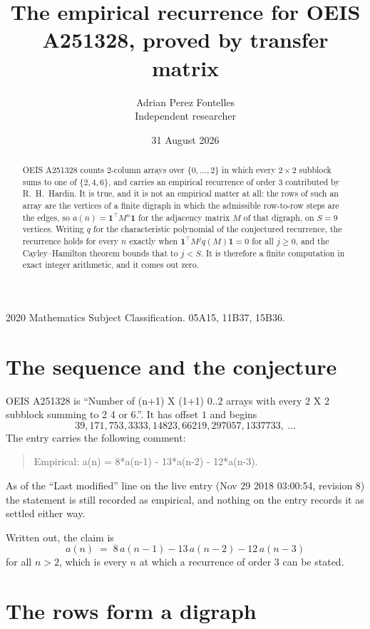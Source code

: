 \documentclass[11pt,a4paper]{article}
\title{The empirical recurrence for OEIS A251328, proved by transfer matrix}
\author{Adrian Perez Fontelles\\ \small Independent researcher}
\date{31 August 2026}
\theoremstyle{plain}
\theoremstyle{definition}
\begin{document}
\maketitle

\begin{abstract}
OEIS A251328 counts $2$-column arrays over $\{0,\dots,2\}$ in which every
$2\times2$ subblock sums to one of $\{2, 4, 6\}$, and carries an empirical
recurrence of order $3$ contributed by R.~H.~Hardin. It is true, and it is not an
empirical matter at all: the rows of such an array are the vertices of a finite digraph in
which the admissible row-to-row steps are the edges, so $a(n)=\mathbf{1}^{\!\top}M^{n}
\mathbf{1}$ for the adjacency matrix $M$ of that digraph, on $S=9$ vertices. Writing
$q$ for the characteristic polynomial of the conjectured recurrence, the recurrence holds
for every $n$ exactly when $\mathbf{1}^{\!\top}M^{j}q(M)\mathbf{1}=0$ for all
$j\ge0$, and the Cayley--Hamilton theorem bounds that to $j<S$. It is therefore a finite
computation in exact integer arithmetic, and it comes out zero.
\end{abstract}

\noindent\small 2020 Mathematics Subject Classification. 05A15, 11B37, 15B36.\normalsize

\section{The sequence and the conjecture}

OEIS A251328 is ``Number of (n+1) X (1+1) 0..2 arrays with every 2 X 2 subblock summing to 2 4 or 6.''. It has offset $1$
and begins
\[
39, 171, 753, 3333, 14823, 66219, 297057, 1337733,\ \dots
\]
The entry carries the following comment:
\begin{quote}\small
Empirical: a(n) = 8*a(n-1) - 13*a(n-2) - 12*a(n-3).
\end{quote}
As of the ``Last modified'' line on the live entry (Nov 29 2018 03:00:54, revision 8) the statement is
still recorded as empirical, and nothing on the entry records it as settled either way.

Written out, the claim is
\begin{equation}\label{eq:conj}
a(n)\;=\;8\,a(n-1) - 13\,a(n-2) - 12\,a(n-3)
\end{equation}
for all $n>2$, which is every $n$ at which a recurrence of order $3$ can be
stated.

\section{The rows form a digraph}
\end{document}
